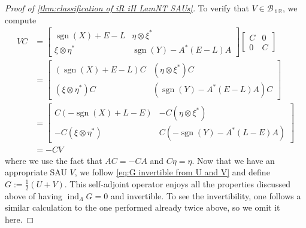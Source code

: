 \documentclass[a4paper,10pt]{article}
\numberwithin{equation}{section}
\theoremstyle{plain}
\theoremstyle{plain}
\theoremstyle{plain}
\theoremstyle{plain}
\theoremstyle{plain}
\theoremstyle{remark}
\theoremstyle{definition}
\theoremstyle{plain}
\newcommand{\ii}{\operatorname{i}}
\newcommand{\RR}{\mathbb{R}}
\newcommand{\calB}{\mathcal{B}}
\newcommand{\sgn}{\operatorname{sgn}}
\newcommand{\findex}{\operatorname{ind}}
\newcommand{\eq}[1]{\begin{align*}#1\end{align*}}
\begin{document}
\begin{proof}[Proof of \cref{thm:classification of iR iH LamNT SAUs}]
		To verify that $V\in\calB_{\ii\RR}$, we compute 
		\eq{
			VC&=\begin{bmatrix}\sgn(X)+E-L & \eta\otimes \xi^* \\ \xi\otimes \eta^* & \sgn(Y)-A^*(E-L)A\end{bmatrix} \begin{bmatrix}C & 0 \\ 0 & C\end{bmatrix}
			\\&=\begin{bmatrix}(\sgn(X)+E-L)C & (\eta\otimes \xi^*)C \\ (\xi\otimes \eta^*)C & (\sgn(Y)-A^*(E-L)A)C\end{bmatrix}
			\\&=\begin{bmatrix}C(-\sgn(X)+L-E) & -C(\eta\otimes \xi^*) \\ -C(\xi\otimes \eta^*) & C(-\sgn(Y)-A^*(L-E)A)\end{bmatrix} 
			\\&=-CV
		}
		where we use the fact that $AC=-CA$ and $C\eta=\eta$. Now that we have an appropriate SAU $V$, we follow \cref{eq:G invertible from U and V} and define $G:=\frac12(U+V)$. This self-adjoint operator enjoys all the properties discussed above of having $\findex_\Lambda G = 0$ and invertible. To see the invertibility, one follows a similar calculation to the one performed already twice above, so we omit it here.
				

\end{proof}
\end{document}
